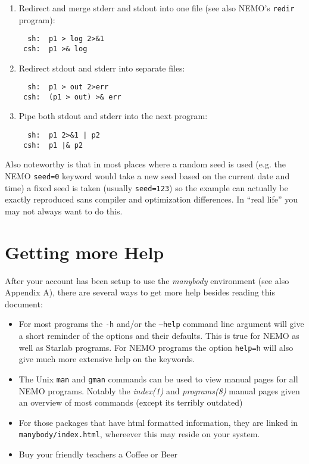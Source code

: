 \begin{enumerate}
\item 
Redirect and merge stderr and stdout into one file 
(see also NEMO's {\tt redir} program):
\footnotesize\begin{verbatim}
  sh:  p1 > log 2>&1
 csh:  p1 >& log
\end{verbatim}\normalsize
\item
Redirect stdout and stderr into separate files:
\footnotesize\begin{verbatim}
  sh:  p1 > out 2>err
 csh:  (p1 > out) >& err
\end{verbatim}\normalsize
\item
Pipe both stdout and stderr into the next program:
\footnotesize\begin{verbatim}
  sh:  p1 2>&1 | p2
 csh:  p1 |& p2
\end{verbatim}\normalsize
\end{enumerate}

Also noteworthy is that 
in most places where a random seed is used (e.g. the NEMO {\tt seed=0} keyword
would take a new seed based on the current date and time) 
a fixed seed is taken (usually {\tt seed=123}) 
so the example can actually be exactly reproduced sans compiler and optimization
differences. In ``real life'' you may not always want to do this.


\section*{Getting more Help}

After your account has been setup to use the {\it manybody} environment
(see also Appendix A), there are several ways to get more help besides
reading this document:
\begin{itemize}
\item
For most programs the {\tt -h} and/or the {\tt --help} 
command line argument will give a short
reminder of the options and their defaults. This is true for NEMO as well
as Starlab programs.
For NEMO programs the option {\tt help=h} will also give much more extensive help
on the keywords.

\item
The Unix {\tt man} and {\tt gman} commands can be used to view manual pages
for all NEMO programs. Notably the {\it index(1)} and {\it programs(8)}
manual pages given an overview of most commands (except its terribly
outdated)

\item
For those packages that have html formatted information, they are
linked in {\tt manybody/index.html}, whereever this may reside on your
system.

\item
Buy your friendly teachers a Coffee or Beer

\end{itemize}

